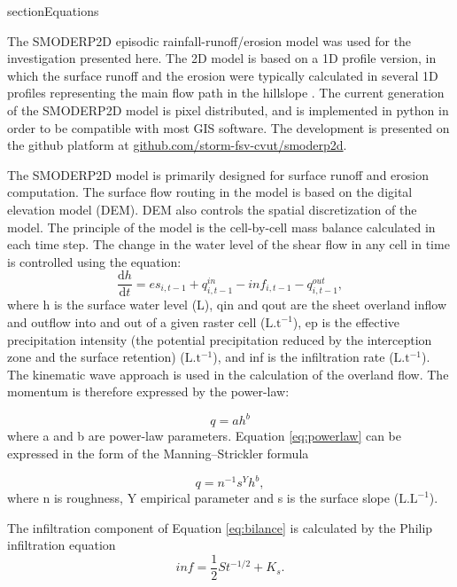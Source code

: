 section{Equations}


The SMODERP2D episodic rainfall-runoff/erosion model was used for the
investigation presented here. The 2D model is based on a 1D profile version, in
which the surface runoff and the erosion were typically calculated in several
1D profiles representing the main flow path in the hillslope \cite{Dostal2000}.
The current generation of the SMODERP2D model is pixel distributed, and is
implemented in python in order to be compatible with most GIS software. The
development is presented on the github platform at
\href{https://github.com/storm-fsv-cvut/smoderp2d}{github.com/storm-fsv-cvut/smoderp2d}.

The SMODERP2D model is primarily designed for surface runoff and erosion
computation. The surface flow routing in the model is based on the digital
elevation model (DEM). DEM also controls the spatial discretization of the
model. The principle of the model is the cell-by-cell mass balance calculated
in each time step. The change in the water level of the shear flow in any cell
in time is controlled using the equation: 
\begin{equation} 
\frac{\mathrm{d}h}{\mathrm{d}t} = es_{i,t-1} + q^{in}_{i,t-1} - inf_{i,t-1} - q^{out}_{i,t-1},
\label{eq:bilance}
\end{equation}
where h is the surface water level (L), qin and qout are the sheet overland
inflow and outflow into and out of a given raster cell ($\mathrm{L.t^{-1}}$),
ep is the effective precipitation intensity (the potential precipitation
reduced by the interception zone and the surface retention)
($\mathrm{L.t^{-1}}$), and inf is the infiltration rate ($\mathrm{L.t^{-1}}$).
The kinematic wave approach is used in the calculation of the overland flow.
The momentum is therefore expressed by the power-law:

\begin{equation} 
q = ah^b
\label{eq:powerlaw}
\end{equation}
where a and b are power-law parameters. Equation \ref{eq:powerlaw} can be expressed in the form of the Manning–Strickler formula


\begin{equation} 
q = n^{-1} s^Y h^b,
\label{eq:powerlaw}
\end{equation}
where n is roughness,  Y  empirical parameter and s is the surface slope ($\mathrm{L.L^{-1}}$).

The infiltration component of Equation \ref{eq:bilance} is calculated by the
Philip infiltration equation \citep{philip1957}
\begin{equation} 
inf = \frac{1}{2}St^{-1/2}+K_s.
\label{eq:infiltration}
\end{equation} 

